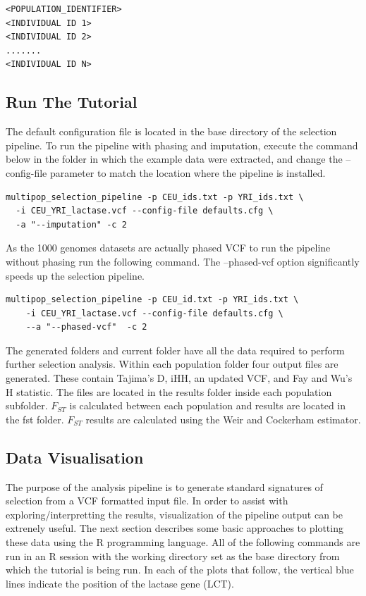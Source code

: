 \documentclass[a4paper,10pt]{article}
\begin{document}
\begin{verbatim}
<POPULATION_IDENTIFIER>
<INDIVIDUAL ID 1>
<INDIVIDUAL ID 2>
.......
<INDIVIDUAL ID N>
\end{verbatim}
\subsection{Run The Tutorial}
The default configuration file is located in the base directory of the
selection pipeline. To run the pipeline with phasing and imputation, execute the command below in the folder in which the example data were extracted, and change the
--config-file parameter to match the location where the pipeline is installed.\\
\begin{verbatim}
multipop_selection_pipeline -p CEU_ids.txt -p YRI_ids.txt \
  -i CEU_YRI_lactase.vcf --config-file defaults.cfg \
  -a "--imputation" -c 2
\end{verbatim}

\noindent
As the 1000 genomes datasets are actually phased VCF to run the pipeline without phasing run the following command. The --phased-vcf option significantly speeds up the selection pipeline.

\begin{verbatim}
multipop_selection_pipeline -p CEU_id.txt -p YRI_ids.txt \
    -i CEU_YRI_lactase.vcf --config-file defaults.cfg \
    --a "--phased-vcf"  -c 2  
\end{verbatim} 

\noindent
The generated folders and current folder have all the data required to
perform further selection analysis. Within each population folder four
output files are generated.  These contain Tajima's D, iHH, an updated
VCF, and Fay and Wu's H statistic. The files are located in the
results folder inside each population subfolder. $F_{ST}$ is calculated
between each population and results are located in the fst folder. $F_{ST}$
results are calculated using the Weir and Cockerham estimator.

\subsection{Data Visualisation}
The purpose of the analysis pipeline is to generate standard signatures of
selection from a VCF formatted input file. In order to assist with
exploring/interpretting the results, visualization of the pipeline
output can be extrenely useful.
The next section describes some basic approaches to 
plotting these data using the R programming language. All of the following
commands are run in an R session with the working directory set as the base
directory from which the tutorial is being run. In each of the plots
that follow, the vertical blue lines indicate the position of the
lactase gene (LCT).
\end{document}
